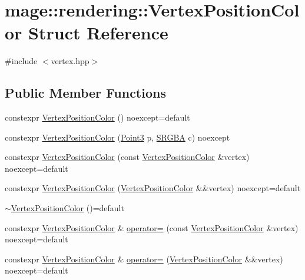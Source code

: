 \hypertarget{structmage_1_1rendering_1_1_vertex_position_color}{}\section{mage\+:\+:rendering\+:\+:Vertex\+Position\+Color Struct Reference}
\label{structmage_1_1rendering_1_1_vertex_position_color}


{\ttfamily \#include $<$vertex.\+hpp$>$}

\subsection*{Public Member Functions}
\begin{DoxyCompactItemize}
\item 
constexpr \hyperlink{structmage_1_1rendering_1_1_vertex_position_color_a2491463aecd8969ed33f85b41a0887c5}{Vertex\+Position\+Color} () noexcept=default
\item 
constexpr \hyperlink{structmage_1_1rendering_1_1_vertex_position_color_ad98b1ccfc9506f70e574a99a330aa989}{Vertex\+Position\+Color} (\hyperlink{structmage_1_1_point3}{Point3} p, \hyperlink{structmage_1_1_s_r_g_b_a}{S\+R\+G\+BA} c) noexcept
\item 
constexpr \hyperlink{structmage_1_1rendering_1_1_vertex_position_color_a4722da066079b70dea70bf892b0652ad}{Vertex\+Position\+Color} (const \hyperlink{structmage_1_1rendering_1_1_vertex_position_color}{Vertex\+Position\+Color} \&vertex) noexcept=default
\item 
constexpr \hyperlink{structmage_1_1rendering_1_1_vertex_position_color_a28e3b4bc9f98e805fc2bfd0553876e15}{Vertex\+Position\+Color} (\hyperlink{structmage_1_1rendering_1_1_vertex_position_color}{Vertex\+Position\+Color} \&\&vertex) noexcept=default
\item 
\hyperlink{structmage_1_1rendering_1_1_vertex_position_color_a80120768659e011119843c29df379e13}{$\sim$\+Vertex\+Position\+Color} ()=default
\item 
constexpr \hyperlink{structmage_1_1rendering_1_1_vertex_position_color}{Vertex\+Position\+Color} \& \hyperlink{structmage_1_1rendering_1_1_vertex_position_color_a8fd53bb8cda2b18504a7dfd386e78463}{operator=} (const \hyperlink{structmage_1_1rendering_1_1_vertex_position_color}{Vertex\+Position\+Color} \&vertex) noexcept=default
\item 
constexpr \hyperlink{structmage_1_1rendering_1_1_vertex_position_color}{Vertex\+Position\+Color} \& \hyperlink{structmage_1_1rendering_1_1_vertex_position_color_afd66f27ff1c0a372f729960260b4decd}{operator=} (\hyperlink{structmage_1_1rendering_1_1_vertex_position_color}{Vertex\+Position\+Color} \&\&vertex) noexcept=default
\end{DoxyCompactItemize}
